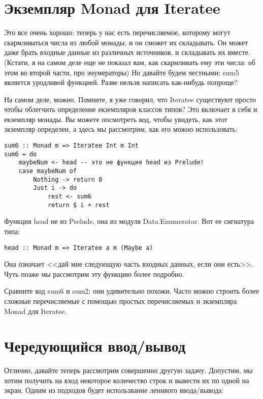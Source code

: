 \section{Экземпляр Monad для Iteratee}

Это все очень хорошо: теперь у нас есть перечисляемое, которому могут скармливаться числа из любой монады, и он сможет их складывать. Он может даже брать входные данные из различных источников, и складывать их вместе. (Кстати, я на самом деле еще не показал вам, как скармливать ему эти числа: об этом во второй части, про энумераторы) Но давайте будем честными: sum5 является уродливой функцией. Разве нельзя написать как-нибудь попроще?

На самом деле, можно. Помните, я уже говорил, что Iteratee существуют просто чтобы облегчить определение екземпляров классов типов? Это включает в себя и екземпляр монады. Вы можете посмотреть код, чтобы увидеть, как этот экземпляр определен, а здесь мы рассмотрим, как его можно использовать:

\begin{lstlisting}
sum6 :: Monad m => Iteratee Int m Int
sum6 = do
    maybeNum <- head -- это не функция head из Prelude!
    case maybeNum of
        Nothing -> return 0
        Just i -> do
            rest <- sum6
            return $ i + rest
\end{lstlisting}%

Функция head не из Prelude, она из модуля Data.Enumerator. Вот ее сигнатура типа:

\begin{lstlisting}
head :: Monad m => Iteratee a m (Maybe a)
\end{lstlisting}

Она означает <<дай мне следующую часть входных данных, если они есть>>. Чуть позже мы рассмотрим эту функцию более подробно.

Сравните код sum6 и sum2: они удивительно похожи. Часто можно строить более сложные перечисляемые с помощью простых перечисляемых и экземпляра Monad для Iteratee.

\section{Чередующийся ввод/вывод}

Отлично, давайте теперь рассмотрим совершенно другую задачу. Допустим, мы хотим получить на вход некоторое количество строк и вывести их по одной на экран. Одним из подходов будет использвание ленивого ввода/вывода:

